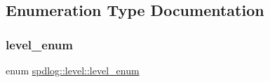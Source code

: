 \subsection{Enumeration Type Documentation}
\mbox{\label{namespacespdlog_1_1level_a35f5227e5daf228d28a207b7b2aefc8b}} 
\subsubsection{\texorpdfstring{level\+\_\+enum}{level\_enum}}
{\footnotesize\ttfamily enum \hyperlink{namespacespdlog_1_1level_a35f5227e5daf228d28a207b7b2aefc8b}{spdlog\+::level\+::level\+\_\+enum}}

